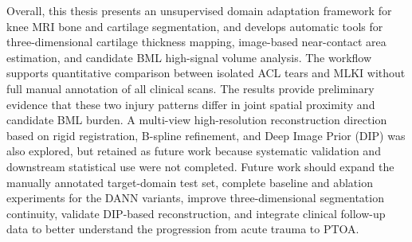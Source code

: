 \begin{digest}
  Overall, this thesis presents an unsupervised domain adaptation framework for knee MRI bone and cartilage segmentation, and develops automatic tools for three-dimensional cartilage thickness mapping, image-based near-contact area estimation, and candidate BML high-signal volume analysis. The workflow supports quantitative comparison between isolated ACL tears and MLKI without full manual annotation of all clinical scans. The results provide preliminary evidence that these two injury patterns differ in joint spatial proximity and candidate BML burden. A multi-view high-resolution reconstruction direction based on rigid registration, B-spline refinement, and Deep Image Prior (DIP) was also explored, but retained as future work because systematic validation and downstream statistical use were not completed. Future work should expand the manually annotated target-domain test set, complete baseline and ablation experiments for the DANN variants, improve three-dimensional segmentation continuity, validate DIP-based reconstruction, and integrate clinical follow-up data to better understand the progression from acute trauma to PTOA.
\end{digest}
